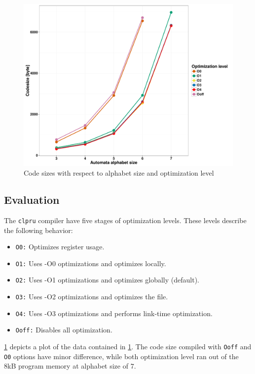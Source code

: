 \begin{figure}
	\centering
	\includegraphics[width = \textwidth]{include/figures/code_size}
	\caption{Code sizes with respect to alphabet size and optimization level}
\label{fig:code_size}
\end{figure}

\subsection{Evaluation}

The \texttt{clpru} compiler have five stages of optimization levels. These levels describe the following behavior:
\begin{itemize}
\item \texttt{O0:} Optimizes register usage.
\item \texttt{O1:} Uses -O0 optimizations and optimizes locally.
\item \texttt{O2:} Uses -O1 optimizations and optimizes globally (default).
\item \texttt{O3:} Uses -O2 optimizations and optimizes the file.
\item \texttt{O4:} Uses -O3 optimizations and performs link-time optimization.
\item \texttt{Ooff:} Disables all optimization.
\end{itemize}

\cref{fig:code_size} depicts a plot of the data contained in \cref{fig:code_size}. The code size compiled with \texttt{Ooff} and \texttt{O0} options have minor difference, while both optimization level ran out of the \si{8}{kB} program memory at alphabet size of $7$.

